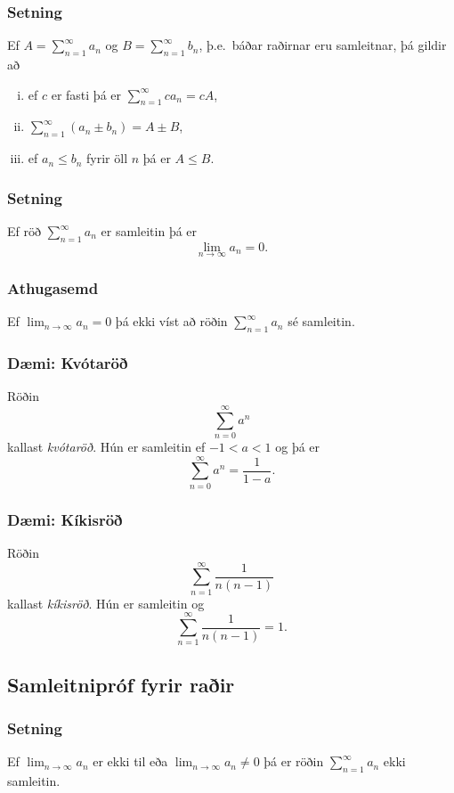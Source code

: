 \documentclass[icelandic,a4paper,12pt]{article}
\begin{document}
\subsubsection{Setning}
Ef $A=\sum_{n=1}^\infty a_n$ og $B=\sum_{n=1}^\infty b_n$, þ.e.~báðar
raðirnar eru samleitnar,  þá gildir að

\begin{enumerate}[(i)] 
\item ef $c$ er fasti þá er $\sum_{n=1}^\infty ca_n=cA$,  
\item $\sum_{n=1}^\infty (a_n\pm b_n)=A\pm B$, 
\item ef $a_n\leq b_n$ fyrir öll $n$ þá er $A\leq B$.
\end{enumerate}

\subsubsection{Setning} 
Ef röð  $\sum_{n=1}^\infty a_n$ er samleitin þá er 
$$\lim_{n\rightarrow\infty}a_n=0.$$

\subsubsection{Athugasemd}
Ef $\lim_{n \to \infty} a_n = 0$ þá  ekki víst að 
röðin $\sum_{n=1}^\infty a_n$ sé samleitin.

\subsubsection{Dæmi: Kvótaröð}
Röðin 
$$
\sum_{n=0}^\infty a^n
$$ 
kallast \emph{kvótaröð}.  Hún er samleitin ef $-1<a<1$ og þá er 
$$
\sum_{n=0}^\infty a^n = \frac{1}{1-a}.
$$ 

\subsubsection{Dæmi: Kíkisröð}
Röðin 
$$
\sum_{n=1}^\infty \frac{1}{n(n-1)}
$$
kallast \emph{kíkisröð}.  Hún er samleitin og
$$
\sum_{n=1}^\infty \frac{1}{n(n-1)} =1.
$$

\subsection{Samleitnipróf fyrir raðir}
\subsubsection{Setning}
Ef $\lim_{n\rightarrow\infty}a_n$ er ekki til eða 
$\lim_{n\rightarrow\infty}a_n\neq 0$  þá er röðin 
$\sum_{n=1}^\infty a_n$ ekki samleitin.
\end{document}
